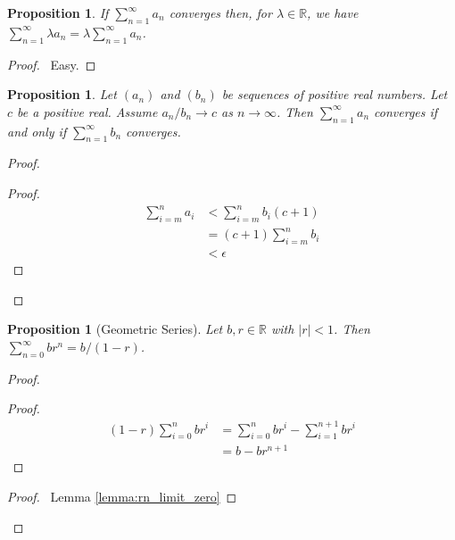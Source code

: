 \documentclass{article}
\let\qed\relax
\newtheorem{proposition}[axiom]{Proposition}
\theoremstyle{definition}
\begin{document}
\begin{proposition}
    If $\sum_{n=1}^\infty a_n$ converges then, for $\lambda \in \mathbb{R}$, we have $\sum_{n=1}^\infty \lambda a_n = \lambda \sum_{n=1}^\infty
    a_n$.
\end{proposition}

\begin{proof}
    \pf\ Easy. \qed
\end{proof}

\begin{proposition}
    Let $(a_n)$ and $(b_n)$ be sequences of positive real numbers. Let $c$ be a positive real. Assume $a_n/b_n \rightarrow c$ as
    $n \rightarrow \infty$. Then $\sum_{n=1}^\infty a_n$ converges if and only if $\sum_{n=1}^\infty b_n$ converges.
\end{proposition}

\begin{proof}
    \pf
    \begin{proof}
        \pf
        \begin{align*}
            \sum_{i=m}^n a_i & < \sum_{i=m}^n b_i (c + 1) \\
            & = (c + 1) \sum_{i=m}^n b_i \\
            & < \epsilon
        \end{align*}
    \end{proof}
    \qed
\end{proof}

\begin{proposition}[Geometric Series]
    Let $b, r \in \mathbb{R}$ with $|r| < 1$. Then $\sum_{n=0}^\infty br^n = b/(1-r)$.
\end{proposition}

\begin{proof}
    \pf
    \begin{proof}
        \pf
        \begin{align*}
            (1-r)\sum_{i=0}^n br^i & = \sum_{i=0}^n br^i - \sum_{i=1}^{n+1} br^i \\
            & = b - br^{n+1}
        \end{align*}
    \end{proof}
    \begin{proof}
        \pf\ Lemma \ref{lemma:rn_limit_zero}
    \end{proof}
    \qed
\end{proof}
\end{document}
